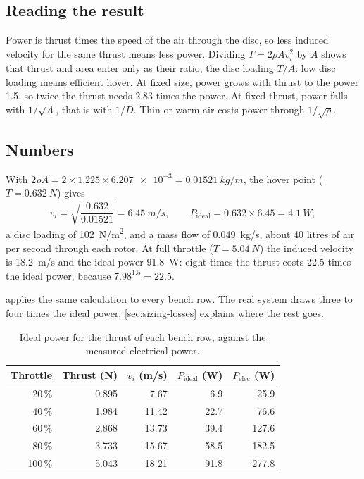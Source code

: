 \subsection{Reading the result}

Power is thrust times the speed of the air through the disc, so less induced velocity for the same thrust means less power. Dividing $T = 2\rho A v_i^2$ by $A$ shows that thrust and area enter only as their ratio, the disc loading $T/A$: low disc loading means efficient hover. At fixed size, power grows with thrust to the power 1.5, so twice the thrust needs 2.83 times the power. At fixed thrust, power falls with $1/\sqrt{A}$, that is with $1/D$. Thin or warm air costs power through $1/\sqrt{\rho}$.

\subsection{Numbers}

With $2\rho A = 2 \times 1.225 \times \num{6.207e-3} = \SI{0.01521}{kg/m}$, the hover point ($T = \SI{0.632}{N}$) gives
\begin{equation}
v_i = \sqrt{\frac{0.632}{0.01521}} = \SI{6.45}{m/s}, \qquad P_\text{ideal} = 0.632 \times 6.45 = \SI{4.1}{W},
\end{equation}
a disc loading of \SI{102}{N/m^2}, and a mass flow of \SI{0.049}{kg/s}, about 40 litres of air per second through each rotor. At full throttle ($T = \SI{5.04}{N}$) the induced velocity is \SI{18.2}{m/s} and the ideal power \SI{91.8}{W}: eight times the thrust costs 22.5 times the ideal power, because $7.98^{1.5} = 22.5$.

 applies the same calculation to every bench row. The real system draws three to four times the ideal power; \cref{sec:sizing-losses} explains where the rest goes.

\begin{table}[htbp]
\centering\small
\caption{Ideal power for the thrust of each bench row, against the measured electrical power.}\label{tab:sizing-ideal}
\begin{tabular}{@{}rrrrr@{}}
\toprule
Throttle & Thrust (N) & $v_i$ (m/s) & $P_\text{ideal}$ (W) & $P_\text{elec}$ (W)\\
\midrule
20\,\% & 0.895 & 7.67 & 6.9 & 25.9\\
40\,\% & 1.984 & 11.42 & 22.7 & 76.6\\
60\,\% & 2.868 & 13.73 & 39.4 & 127.6\\
80\,\% & 3.733 & 15.67 & 58.5 & 182.5\\
100\,\% & 5.043 & 18.21 & 91.8 & 277.8\\
\bottomrule
\end{tabular}
\end{table}


